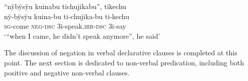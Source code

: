 \ea\label{ex:neg-dsc}
\begingl
\glpreamble “nÿbÿsÿu kuinabu tichujikabu”, tikechu\\
\gla nÿ-bÿsÿu kuina-bu ti-chujika-bu ti-kechu\\
\textsc{sg}-come \textsc{neg}-\textsc{dsc} 3i-speak.\textsc{irr}-\textsc{dsc} 3i-say\\
\glft ‘“when I came, he didn’t speak anymore”, he said’
\endgl
\trailingcitation{[jxx-p120430l-2.456]}
\xe
{}

The discussion of negation in verbal declarative clauses is completed at this point. The next section is dedicated to non-verbal predication, including both positive and negative non-verbal clauses. 





%
%








